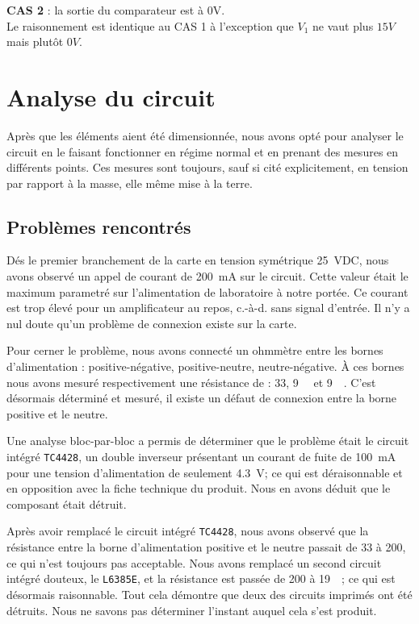 \documentclass[10pt, oneside, a4paper]{article}
\begin{document}
\noindent\textbf{CAS 2} : la sortie du comparateur est à 0V. \\
Le raisonnement est identique au CAS 1 à l'exception que $V_1$ ne vaut plus $15V$ mais plutôt $0V$.



\section{Analyse du circuit}
Après que les éléments aient été dimensionnée, nous avons opté pour analyser le circuit en le faisant fonctionner en régime normal et en prenant des mesures en différents points.
Ces mesures sont toujours, sauf si cité explicitement, en tension par rapport à la masse, elle même mise à la terre.

\subsection{Problèmes rencontrés}
\label{sec:problems}
Dés le premier branchement de la carte en tension symétrique \pm\SI{25}{\volt}DC,
nous avons observé un appel de courant de \SI{200}{\milli\ampere} sur le circuit.
Cette valeur était le maximum parametré sur l'alimentation de laboratoire à notre portée.
Ce courant est trop élevé pour un amplificateur au repos, c.-à-d. sans signal d'entrée.
Il n'y a nul doute qu'un problème de connexion existe sur la carte.

Pour cerner le problème, nous avons connecté un ohmmètre entre les bornes d'alimentation : positive-négative, positive-neutre, neutre-négative.
À ces bornes nous avons mesuré respectivement une résistance de : \SI{33}{\Omega}, \SI{9}{\kilo\Omega} et \SI{9}{\kilo\Omega}.
C'est désormais déterminé et mesuré, il existe un défaut de connexion entre la borne positive et le neutre.

Une analyse bloc-par-bloc a permis de déterminer que le problème était le circuit intégré \texttt{TC4428}, un double inverseur présentant un courant de fuite de \SI{100}{\milli\ampere} pour une tension d'alimentation de seulement \SI{4.3}{\volt};
ce qui est déraisonnable et en opposition avec la fiche technique du produit.
Nous en avons déduit que le composant était détruit.

Après avoir remplacé le circuit intégré \texttt{TC4428}, nous avons observé que la résistance entre la borne d'alimentation positive et le neutre passait de \SI{33}{\Omega} à \SI{200}{\Omega}, ce qui n'est toujours pas acceptable.
Nous avons remplacé un second circuit intégré douteux, le \verb|L6385E|, et la résistance est passée de \SI{200}{\Omega} à \SI{19}{\kilo\Omega}; ce qui est désormais raisonnable.
Tout cela démontre que deux des circuits imprimés ont été détruits.
Nous ne savons pas déterminer l'instant auquel cela s'est produit.
\end{document}
